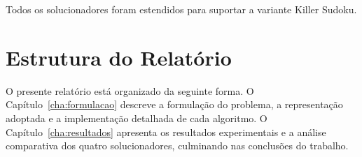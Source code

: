 Todos os solucionadores foram estendidos para suportar a variante Killer Sudoku.

\section{Estrutura do Relatório}
\label{sec:estrutura}

O presente relatório está organizado da seguinte forma. O Capítulo~\ref{cha:formulacao} descreve a formulação do problema, a representação adoptada e a implementação detalhada de cada algoritmo. O Capítulo~\ref{cha:resultados} apresenta os resultados experimentais e a análise comparativa dos quatro solucionadores, culminando nas conclusões do trabalho.
